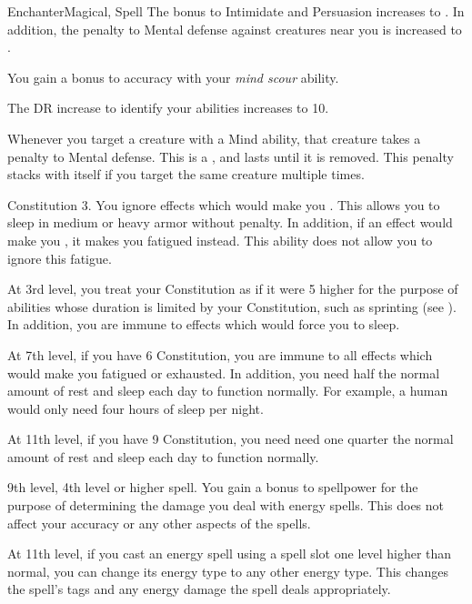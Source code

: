 \begin{feat}{Enchanter}{Magical, Spell}
         The bonus to Intimidate and Persuasion increases to .
        In addition, the penalty to Mental defense against creatures near you is increased to .

         You gain a  bonus to accuracy with your \textit{mind scour} ability.

         The DR increase to identify your  abilities increases to 10.

         Whenever you target a creature with a Mind ability, that creature takes a  penalty to Mental defense.
        This is a , and lasts until it is removed.
        This penalty stacks with itself if you target the same creature multiple times.
    \end{feat}


    \featpre Constitution 3.
    \featben You ignore effects which would make you \fatigued.
    This allows you to sleep in medium or heavy armor without penalty.
    In addition, if an effect would make you \exhausted, it makes you fatigued instead.
    This ability does not allow you to ignore this fatigue.

    At 3rd level, you treat your Constitution as if it were 5 higher for the purpose of abilities whose duration is limited by your Constitution, such as sprinting (see ).
    In addition, you are immune to effects which would force you to sleep.

    At 7th level, if you have 6 Constitution, you are immune to all effects which would make you fatigued or exhausted.
    In addition, you need half the normal amount of rest and sleep each day to function normally.
    For example, a human would only need four hours of sleep per night.

    At 11th level, if you have 9 Constitution, you need need one quarter the normal amount of rest and sleep each day to function normally.

    \featpre 9th level, 4th level or higher  spell.
    \featben You gain a  bonus to spellpower for the purpose of determining the damage you deal with energy spells.
    This does not affect your accuracy or any other aspects of the spells.

    At 11th level, if you cast an energy spell using a spell slot one level higher than normal, you can change its energy type to any other energy type.
    This changes the spell's tags and any energy damage the spell deals appropriately.

